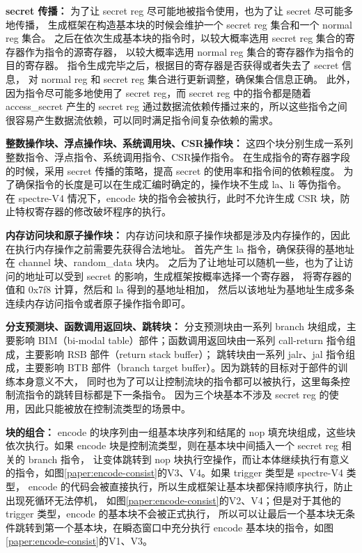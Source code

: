 \textbf{secret 传播：}
为了让 secret reg 尽可能地被指令使用，也为了让 secret 尽可能多地传播，
生成框架在构造基本块的时候会维护一个 secret reg 集合和一个 normal reg 集合。
之后在依次生成基本块的指令时，以较大概率选用 secret reg 集合的寄存器作为指令的源寄存器，
以较大概率选用 normal reg 集合的寄存器作为指令的目的寄存器。
指令生成完毕之后，根据目的寄存器是否获得或者失去了 secret 信息，
对 normal reg 和 secret reg 集合进行更新调整，确保集合信息正确。
此外，因为指令尽可能多地使用了 secret reg，而 secret reg 中的指令都是随着 access\_secret 产生的 secret reg
通过数据流依赖传播过来的，所以这些指令之间很容易产生数据流依赖，可以同时满足指令间复杂依赖的需求。\par

\textbf{整数操作块、浮点操作块、系统调用块、CSR操作块：}
这四个块分别生成一系列整数指令、浮点指令、系统调用指令、CSR操作指令。
在生成指令的寄存器字段的时候，采用 secret 传播的策略，提高 secret 的使用率和指令间的依赖程度。
为了确保指令的长度是可以在生成汇编时确定的，操作块不生成 la、li 等伪指令。
在 spectre-V4 情况下，encode 块的指令会被执行，此时不允许生成 CSR 块，防止特权寄存器的修改破坏程序的执行。\par

\textbf{内存访问块和原子操作块：}
内存访问块和原子操作块都是涉及内存操作的，因此在执行内存操作之前需要先获得合法地址。
首先产生 la 指令，确保获得的基地址在 channel 块、random\_data 块内。
之后为了让地址可以随机一些，也为了让访问的地址可以受到 secret 的影响，生成框架按概率选择一个寄存器，
将寄存器的值和 0x7f8 计算，然后和 la 得到的基地址相加，
然后以该地址为基地址生成多条连续内存访问指令或者原子操作指令即可。\par

\textbf{分支预测块、函数调用返回块、跳转块：}
分支预测块由一系列 branch 块组成，主要影响 BIM（bi-modal table）部件；函数调用返回块由一系列 call-return 指令组成，主要影响 RSB 部件（return stack buffer）；
跳转块由一系列 jalr、jal 指令组成，主要影响 BTB 部件（branch target buffer）。因为跳转的目标对于部件的训练本身意义不大，
同时也为了可以让控制流块的指令都可以被执行，这里每条控制流指令的跳转目标都是下一条指令。
因为三个块基本不涉及 secret reg 的使用，因此只能被放在控制流类型的场景中。\par

\textbf{块的组合：}
encode 的块序列由一组基本块序列和结尾的 nop 填充块组成，这些块依次执行。如果 encode 块是控制流类型，则在基本块中间插入一个 secret reg 相关的 branch 指令，
让变体跳转到 nop 块执行空操作，而让本体继续执行有意义的指令，如图\ref{paper:encode-consist}的V3、V4。如果 trigger 类型是 spectre-V4 类型，
encode 的代码会被直接执行，所以生成框架让基本块都保持顺序执行，防止出现死循环无法停机，
如图\ref{paper:encode-consist}的V2、V4；但是对于其他的 trigger 类型，encode 的基本块不会被正式执行，
所以可以让最后一个基本块无条件跳转到第一个基本块，在瞬态窗口中充分执行 encode 基本块的指令，如图\ref{paper:encode-consist}的V1、V3。\par

